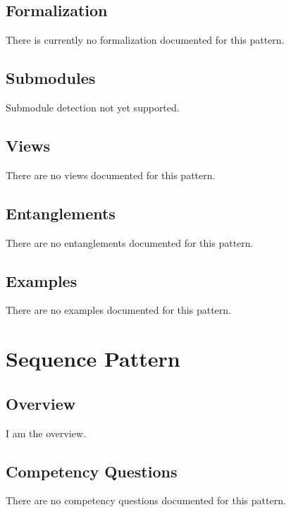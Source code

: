 \subsection{Formalization}
\label{ssec:formalization}
There is currently no formalization documented for this pattern.

\subsection{Submodules}
\label{ssec:submodules}
Submodule detection not yet supported.

\subsection{Views}
\label{ssec:views}
There are no views documented for this pattern.


\subsection{Entanglements}
\label{ssec:entanglements}
There are no entanglements documented for this pattern.

\subsection{Examples}
\label{ssec:examples}
There are no examples documented for this pattern.


\section{Sequence Pattern}
\label{sec:sequence-pattern}
\subsection{Overview}
\label{ssec:overview}
I am the overview.

\subsection{Competency Questions}
\label{ssec:cqs}
There are no competency questions documented for this pattern.

